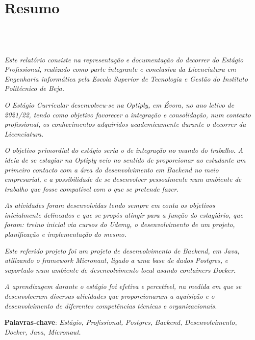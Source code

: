 \chapter{Resumo}
\section*{\textit{\TITULO}\\  {\small{\textit{\SUBTITULO}}}}

\textit{Este relatório consiste na representação e documentação do decorrer do Estágio Profissional, realizado como parte integrante e conclusiva da Licenciatura em Engenharia informática pela Escola Superior de Tecnologia e Gestão do Instituto Politécnico de Beja.}

\textit{O Estágio Curricular desenvolveu-se na Optiply, em Évora, no ano letivo de 2021/22, tendo como objetivo favorecer a integração e consolidação, num contexto profissional, os conhecimentos adquiridos academicamente durante o decorrer da Licenciatura.}

\textit{O objetivo primordial do estágio seria o de integração no mundo do trabalho. A ideia de se estagiar na Optiply veio no sentido de proporcionar ao estudante um primeiro contacto com a área do desenvolvimento em Backend no meio empresarial, e a possibilidade de se desenvolver pessoalmente num ambiente de trabalho que fosse compatível com o que se pretende fazer.}

\textit{As atividades foram desenvolvidas tendo sempre em conta os objetivos inicialmente delineados e que se propôs atingir para a função do estagiário, que foram: treino inicial via cursos do Udemy, o desenvolvimento de um projeto, planificação e implementação do mesmo.}

\textit{Este referido projeto foi um projeto de desenvolvimento de Backend, em Java, utilizando o framework Micronaut, ligado a uma base de dados Postgres, e suportado num ambiente de desenvolvimento local usando containers Docker.}

\textit{A aprendizagem durante o estágio foi efetiva e percetível, na medida em que se desenvolveram diversas atividades que proporcionaram a aquisição e o desenvolvimento de diferentes competências técnicas e organizacionais.}

\textbf{Palavras-chave}: \textit{Estágio, Profissional, Postgres, Backend, Desenvolvimento, Docker, Java, Micronaut}.
